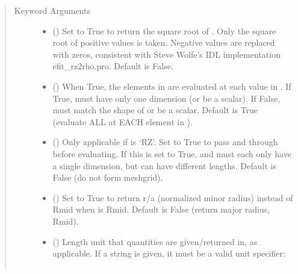 \documentclass[letterpaper,10pt,english]{sphinxmanual}
\begin{document}
\begin{fulllineitems}
\begin{fulllineitems}
\begin{quote}
\begin{description}
\item[{Keyword Arguments}] \leavevmode\begin{itemize}
\item {} 
 () \textendash{} Set to True to return the square root of . Only
the square root of positive values is taken. Negative values are
replaced with zeros, consistent with Steve Wolfe’s IDL
implementation efit\_rz2rho.pro. Default is False.

\item {} 
 () \textendash{} When True, the elements in  are evaluated at
each value in . If True,  must have only one dimension (or
be a scalar). If False,  must match the shape of  or be
a scalar. Default is True (evaluate ALL  at EACH element in
).

\item {} 
 () \textendash{} Only applicable if  is ‘RZ’. Set to
True to pass  and  through 
before evaluating. If this is set to True,  and  must each
only have a single dimension, but can have different lengths.
Default is False (do not form meshgrid).

\item {} 
 () \textendash{} Set to True to return r/a (normalized minor radius)
instead of Rmid when  is Rmid. Default is False
(return major radius, Rmid).

\item {} 
 () \textendash{} 
Length unit that quantities are
given/returned in, as applicable. If a string is given, it must
be a valid unit specifier:
\begin{quote}


\begin{savenotes}\sphinxattablestart
\centering
\begin{tabulary}{\linewidth}[t]{|T|T|}
\hline


\end{tabulary}
\end{savenotes}
\end{quote}
\end{itemize}
\end{description}
\end{quote}
\end{fulllineitems}
\end{fulllineitems}
\end{document}
